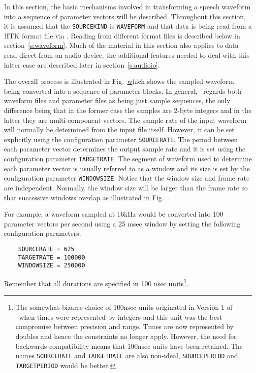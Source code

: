 
In this section, the basic mechanisms involved in transforming a
speech waveform into a sequence of parameter vectors will be
described.  Throughout this section, it is assumed that the
\texttt{SOURCEKIND} is \texttt{WAVEFORM} and that data is being read from
a HTK format file via .  Reading from different format
files is described below in section~\ref{s:waveform}.
Much of the
material in this section also applies to data read direct from an audio 
device, the
additional features needed to deal with this latter case are
described later in section~\ref{s:audioio}.
\vspace{0.2cm}

The overall process is illustrated in Fig.~\href{f:Blocking}
which shows the sampled waveform being converted into a 
sequence of parameter blocks.  In general, \HTK\ regards
both waveform files and parameter files as being just
sample sequences, the only difference being that in the former
case the samples are 2-byte integers and in the latter they
are multi-component vectors.  The sample rate of the input
waveform will normally be determined from the input file
itself.  However, it can be set explicitly using the
configuration parameter \texttt{SOURCERATE}.  The period
between each parameter vector determines the output sample
rate and it is set using the configuration parameter 
\texttt{TARGETRATE}.  The segment of waveform used to determine
each parameter vector is usually referred to as a window
and its size is set by the
configuration parameter \texttt{WINDOWSIZE}.  Notice that the
window size and frame rate are independent.  Normally,
the window size will be larger than the frame rate so that
successive windows overlap as illustrated in 
Fig.~\href{f:Blocking}.

For example, a waveform sampled
at 16kHz 
would be converted into 100 parameter vectors per
second using a 25 msec window by setting the following
configuration parameters.
\begin{verbatim}
    SOURCERATE = 625
    TARGETRATE = 100000
    WINDOWSIZE = 250000
\end{verbatim}
Remember that all durations are specified in 100 nsec units\footnote{
The somewhat bizarre choice of 100nsec units originated in Version 1 of
\HTK\ when times were represented by integers and this unit was the best
compromise between precision and range.  Times are now represented by
doubles and hence the constraints no longer apply.  However, the need for backwards
compatibility means that 100nsec units have been retained.  The names
\texttt{SOURCERATE} and \texttt{TARGETRATE} are also non-ideal, 
\texttt{SOURCEPERIOD} and \texttt{TARGETPERIOD} would be better. 
}.


